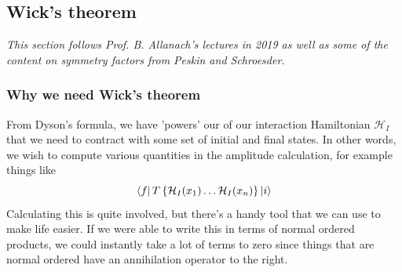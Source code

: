 \documentclass[11pt, oneside]{article}   	%
\theoremstyle{newline}
\theoremstyle{newline}
\theoremstyle{newline}
\theoremstyle{newline}
\theoremstyle{newline}
\begin{document}
\subsection{Wick's theorem} 
\textit{This section follows Prof. B. Allanach's lectures in 2019 as well as 
some of the content on symmetry factors from Peskin and Schroesder.} 

\subsubsection{Why we need Wick's theorem} 

From Dyson's formula, we have 'powers' 
our of our interaction Hamiltonian $ \mathcal{ H }_ I$
that we need to contract with some
set of initial and final states. 
In other words, we wish to compute various quantities in the amplitude calculation, for 
example things like 
\[
\bra{ f } T \left\{  \mathcal{ H } _ I ( x_1) \dots \mathcal{ H }_ I ( x_{ n  })  \right\}\ket{ i }  
\] Calculating this is quite involved, but there's a handy tool that 
we can use to make life easier. If we were able to 
write this in terms of normal ordered products, we could 
instantly take a lot of terms to zero since things that 
are normal ordered have an annihilation operator to the right. 
\end{document}
